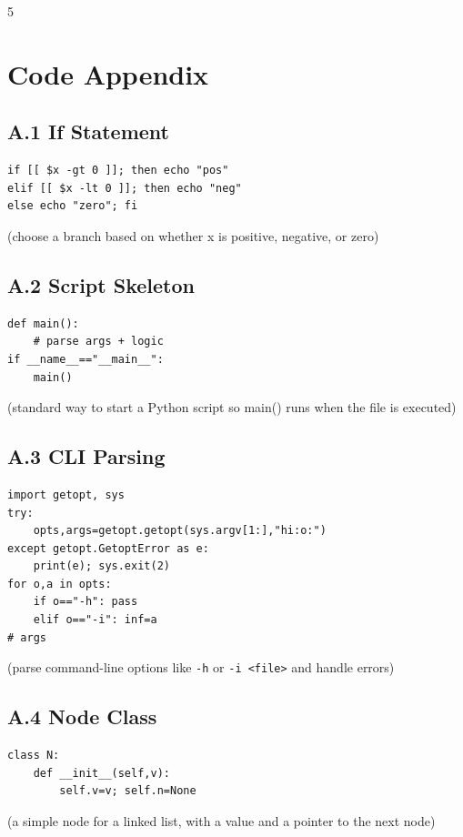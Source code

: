 \documentclass[6pt,landscape]{article}
\begin{document}
\begin{multicols}{5}
\section{Code Appendix}\label{sec:code}

\subsection{A.1 If Statement}\label{code:A1}
\begin{verbatim}
if [[ $x -gt 0 ]]; then echo "pos"
elif [[ $x -lt 0 ]]; then echo "neg"
else echo "zero"; fi
\end{verbatim}
(choose a branch based on whether x is positive, negative, or zero)

\subsection{A.2 Script Skeleton}\label{code:A2}
\begin{verbatim}
def main():
    # parse args + logic
if __name__=="__main__":
    main()
\end{verbatim}
(standard way to start a Python script so main() runs when the file is executed)

\subsection{A.3 CLI Parsing}\label{code:A3}
\begin{verbatim}
import getopt, sys
try:
    opts,args=getopt.getopt(sys.argv[1:],"hi:o:")
except getopt.GetoptError as e:
    print(e); sys.exit(2)
for o,a in opts:
    if o=="-h": pass
    elif o=="-i": inf=a
# args
\end{verbatim}
(parse command-line options like \texttt{-h} or \texttt{-i <file>} and handle errors)

\subsection{A.4 Node Class}\label{code:A4}
\begin{verbatim}
class N:
    def __init__(self,v):
        self.v=v; self.n=None
\end{verbatim}
(a simple node for a linked list, with a value and a pointer to the next node)


\end{multicols}
\end{document}
